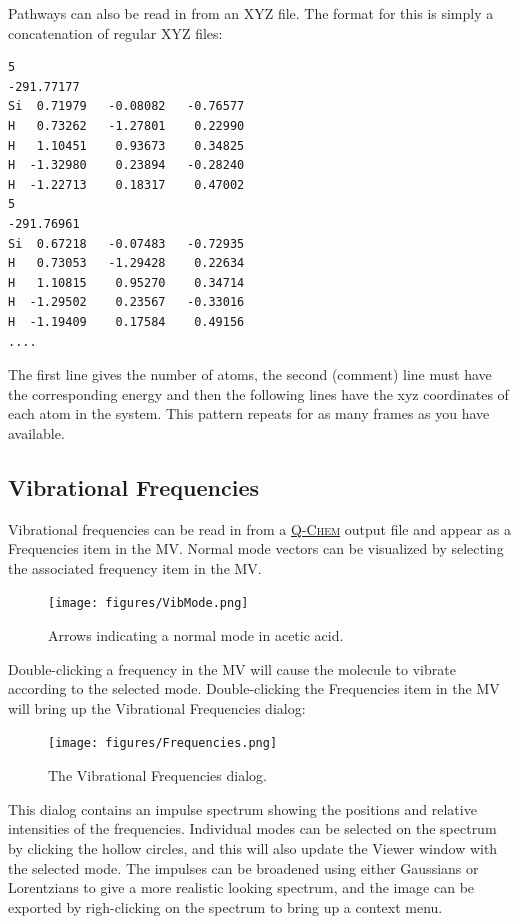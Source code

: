\documentclass[a4paper,12pt]{article}
\newcommand{\qchem}{\href{http://q-chem.com}{{\scshape Q-Chem}}}
\begin{document}
Pathways can also be read in from an XYZ file.  The format for this is simply a
concatenation of regular XYZ files:
{\footnotesize
\begin{verbatim}
5
-291.77177
Si  0.71979   -0.08082   -0.76577  
H   0.73262   -1.27801    0.22990   
H   1.10451    0.93673    0.34825   
H  -1.32980    0.23894   -0.28240  
H  -1.22713    0.18317    0.47002   
5
-291.76961
Si  0.67218   -0.07483   -0.72935  
H   0.73053   -1.29428    0.22634   
H   1.10815    0.95270    0.34714   
H  -1.29502    0.23567   -0.33016  
H  -1.19409    0.17584    0.49156 
....
\end{verbatim}
}
The first line gives the number of atoms, the second (comment) line must have
the corresponding energy and then the following lines have the xyz coordinates
of each atom in the system.  This pattern repeats for as many frames as you have
available.



\subsection{Vibrational Frequencies}

Vibrational frequencies can be read in from a \qchem{} output file and appear
as a Frequencies item in the MV.  Normal mode vectors can be visualized by
selecting the associated frequency item in the MV.
\begin{figure}[h]
\begin{center}
\texttt{[image: figures/VibMode.png]}
\caption{Arrows indicating a normal mode in acetic acid.}
\end{center}
\end{figure}

Double-clicking a frequency in the MV will cause the molecule to vibrate
according to the selected mode.  Double-clicking the Frequencies item in the 
MV will bring up the Vibrational Frequencies dialog:
\begin{figure}[h]
\begin{center}
\texttt{[image: figures/Frequencies.png]}
\caption{The Vibrational Frequencies dialog.}
\end{center}
\end{figure}

This dialog contains an impulse spectrum showing the positions and relative
intensities of the frequencies.  Individual modes can be selected on the
spectrum by clicking the hollow circles, and this will also update the Viewer
window with the selected mode.  The impulses can be broadened using either
Gaussians or Lorentzians to give a more realistic looking spectrum, and the
image can be exported by righ-clicking on the spectrum to bring up a context
menu.
\end{document}
